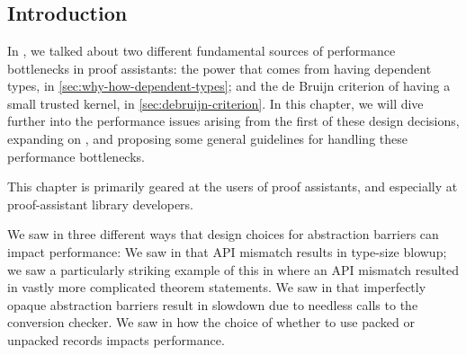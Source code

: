 \chapter{}\label{ch:design}\label{ch:api-design}\label{ch:abstraction}

\section{Introduction}
In , we talked about two different fundamental sources of performance bottlenecks in proof assistants:
the power that comes from having dependent types, in \autoref{sec:why-how-dependent-types};
and the de Bruijn criterion of having a small trusted kernel, in \autoref{sec:debruijn-criterion}.
In this chapter, we will dive further into the performance issues arising from the first of these design decisions, expanding on , and proposing some general guidelines for handling these performance bottlenecks.

This chapter is primarily geared at the users of proof assistants, and especially at proof-assistant library developers.

We saw in  three different ways that design choices for abstraction barriers can impact performance:
We saw in  that API mismatch results in type-size blowup; we saw a particularly striking example of this in  where an API mismatch resulted in vastly more complicated theorem statements.
We saw in  that imperfectly opaque abstraction barriers result in slowdown due to needless calls to the conversion checker.
We saw in  how the choice of whether to use packed or unpacked records impacts performance.

